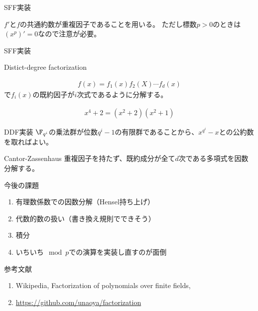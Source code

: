 \documentclass{beamer}
\begin{document}
\begin{frame}{SFF実装}

$f'$と$f$の共通約数が重複因子であることを用いる。
ただし標数$p>0$のときは$(x^p)'=0$なので注意が必要。


\end{frame}

\begin{frame}{SFF実装}
\end{frame}


\begin{frame}{Distict-degree factorization}

\begin{align*}
f(x)=f_1(x)f_2(X)\cdots f_d(x)
\end{align*}
で$f_i(x)$の既約因子が$i$次式であるように分解する。

\begin{align*}
x^4+2=(x^2+2)(x^2+1)
\end{align*}
\end{frame}

\begin{frame}{DDF実装}
$\F_{q^i}$の乗法群が位数$q^i-1$の有限群であることから、$x^{q^i}-x$との公約数を取ればよい。

\end{frame}

\begin{frame}{Cantor-Zassenhaus}
重複因子を持たず、既約成分が全て$d$次である多項式を因数分解する。

\end{frame}

\begin{frame}{今後の課題}
\begin{enumerate}
\item 有理数係数での因数分解（Hensel持ち上げ）
\item 代数的数の扱い（書き換え規則でできそう）
\item 積分
\item いちいち$\mod p$での演算を実装し直すのが面倒
\end{enumerate}
\end{frame}

\begin{frame}{参考文献}
\begin{enumerate}
\item Wikipedia, Factorization of polynomials over finite fields,
\item \url{https://github.com/unaoya/factorization}
\end{enumerate}
\end{frame}
\end{document}
